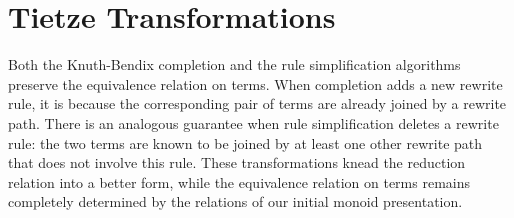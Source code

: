 \documentclass[../generics]{subfiles}
\begin{document}
\section{Tietze Transformations}\label{tietze transformations}

Both the Knuth-Bendix completion and the rule simplification algorithms preserve the equivalence relation on terms. When completion adds a new rewrite rule, it is because the corresponding pair of terms are already joined by a rewrite path. There is an analogous guarantee when rule simplification deletes a rewrite rule: the two terms are known to be joined by at least one other rewrite path that does not involve this rule. These transformations knead the reduction relation into a better form, while the equivalence relation on terms remains completely determined by the relations of our initial monoid presentation.
\end{document}
